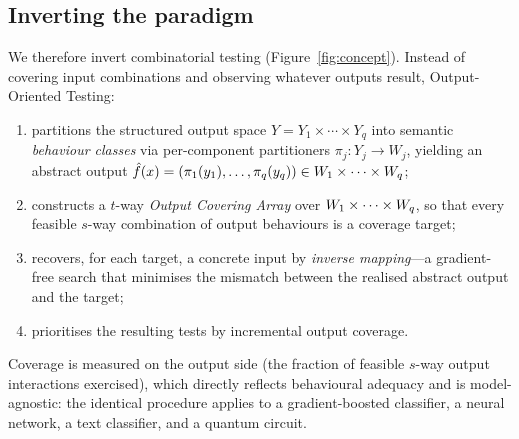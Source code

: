 \subsection{Inverting the paradigm}
We therefore invert combinatorial testing (Figure~\ref{fig:concept}). Instead of
covering input combinations and observing whatever outputs result, \rnwise{}
Output-Oriented Testing:
\begin{enumerate}
\item partitions the structured output space $Y = Y_1 \times \cdots \times Y_q$
into semantic \emph{behaviour classes} via per-component partitioners
$\pi_j: Y_j \to W_j$, yielding an abstract output $\hat{f}(x) =
(\pi_1(y_1),\dots,\pi_q(y_q)) \in W_1\times\cdots\times W_q$;
\item constructs a $t$-way \emph{Output Covering Array} over $W_1\times\cdots\times W_q$, so that
every feasible $s$-way combination of output behaviours is a coverage target;
\item recovers, for each target, a concrete input by \emph{inverse mapping}---a
gradient-free search that minimises the mismatch between the realised abstract
output and the target;
\item prioritises the resulting tests by incremental output coverage.
\end{enumerate}
Coverage is measured on the output side (the fraction of feasible $s$-way output
interactions exercised), which directly reflects behavioural adequacy and is
model-agnostic: the identical procedure applies to a gradient-boosted classifier,
a neural network, a text classifier, and a quantum circuit.

